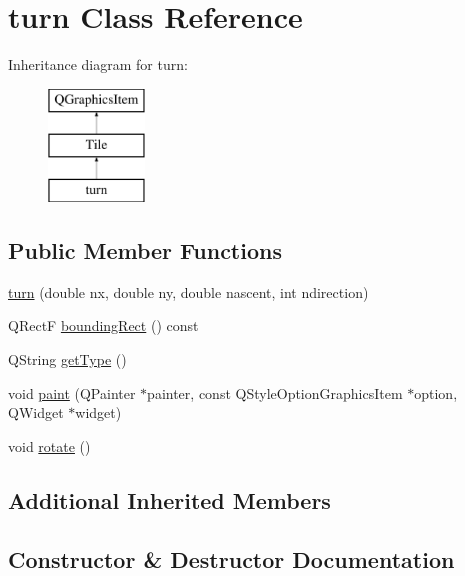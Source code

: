 \hypertarget{classturn}{}\section{turn Class Reference}
\label{classturn}
Inheritance diagram for turn\+:\begin{figure}[H]
\begin{center}
\leavevmode
\includegraphics[height=3.000000cm]{classturn}
\end{center}
\end{figure}
\subsection*{Public Member Functions}
\begin{DoxyCompactItemize}
\item 
\mbox{\hyperlink{classturn_aa00a91ae978f5c08e8d8294ed438e785}{turn}} (double nx, double ny, double nascent, int ndirection)
\item 
Q\+RectF \mbox{\hyperlink{classturn_ad04b4ca6ec629c381d38bafbbf0c7052}{bounding\+Rect}} () const
\item 
Q\+String \mbox{\hyperlink{classturn_aee2e0c3c195f855186f12868232b18dd}{get\+Type}} ()
\item 
void \mbox{\hyperlink{classturn_a227bb1866470de67a42cc79890b5bf65}{paint}} (Q\+Painter $\ast$painter, const Q\+Style\+Option\+Graphics\+Item $\ast$option, Q\+Widget $\ast$widget)
\item 
void \mbox{\hyperlink{classturn_a91ab1e69c9ec2d7ded346a2701e1be1d}{rotate}} ()
\end{DoxyCompactItemize}
\subsection*{Additional Inherited Members}


\subsection{Constructor \& Destructor Documentation}
\mbox{\label{classturn_aa00a91ae978f5c08e8d8294ed438e785}} 
